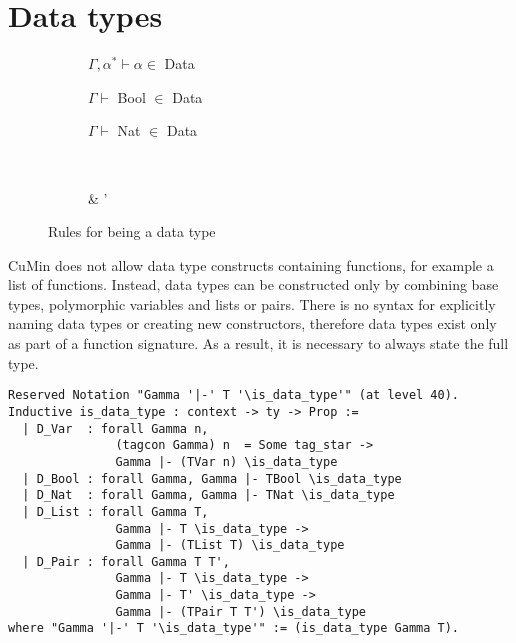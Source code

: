 \documentclass[fleqn]{scrreprt}
\begin{document}
\section{Data types}
\begin{figure}[H]
	\begin{center}
		\begin{subfigure}{.25 \linewidth}
			\centering
			$\Gamma, \alpha^{*} \vdash \alpha \in$ Data
		\end{subfigure}
		\begin{subfigure}{.25 \linewidth}
			\centering
			$\Gamma \vdash$ Bool $\in$ Data
		\end{subfigure}
		\begin{subfigure}{.25 \linewidth}
			\centering
			$\Gamma \vdash$ Nat $\in$ Data
		\end{subfigure}\\
		\vspace{1em}
		\begin{subfigure}{.375 \linewidth}
			\centering
			      {\Gamma \vdash \tau \in {}}
		\end{subfigure}
		\hspace{.1 \linewidth}
		\begin{subfigure}{.375 \linewidth}
			\centering
			      {\Gamma \vdash \tau \in {} & \Gamma \vdash \tau' \in {}}
		\end{subfigure}
	\end{center}
	\caption{Rules for being a data type}
\end{figure}
CuMin does not allow data type constructs containing functions, for example a list of functions. Instead, data types can be constructed only by combining base types, polymorphic variables and lists or pairs. There is no syntax for explicitly naming data types or creating new constructors, therefore data types exist only as part of a function signature. As a result, it is necessary to always state the full type.
\begin{verbatim}
Reserved Notation "Gamma '|-' T '\is_data_type'" (at level 40).
Inductive is_data_type : context -> ty -> Prop :=
  | D_Var  : forall Gamma n,
               (tagcon Gamma) n  = Some tag_star ->
               Gamma |- (TVar n) \is_data_type
  | D_Bool : forall Gamma, Gamma |- TBool \is_data_type
  | D_Nat  : forall Gamma, Gamma |- TNat \is_data_type
  | D_List : forall Gamma T,
               Gamma |- T \is_data_type ->
               Gamma |- (TList T) \is_data_type
  | D_Pair : forall Gamma T T', 
               Gamma |- T \is_data_type ->
               Gamma |- T' \is_data_type ->
               Gamma |- (TPair T T') \is_data_type
where "Gamma '|-' T '\is_data_type'" := (is_data_type Gamma T).
\end{verbatim}
\end{document}
